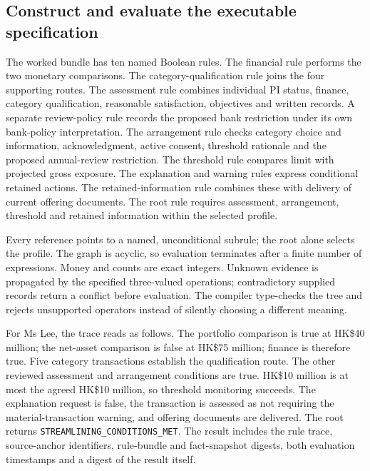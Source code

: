 \subsection{Construct and evaluate the executable specification}
\label{merge:P-01b-complete-dry-run:04}


The worked bundle has ten named Boolean rules. The financial rule performs the
two monetary comparisons. The category-qualification rule joins the four
supporting routes. The assessment rule combines individual PI status, finance,
category qualification, reasonable satisfaction, objectives and written records.
A separate review-policy rule records the proposed bank restriction under its
own bank-policy interpretation. The arrangement rule checks category choice and information, acknowledgment,
active consent, threshold rationale and the proposed annual-review restriction.
The threshold rule compares limit with projected gross exposure. The explanation
and warning rules express conditional retained actions. The retained-information
rule combines these with delivery of current offering documents. The root rule
requires assessment, arrangement, threshold and retained information within the
selected profile.

Every reference points to a named, unconditional subrule; the root alone selects
the profile. The graph is acyclic, so evaluation terminates after a finite number
of expressions. Money and counts are exact integers. Unknown evidence is
propagated by the specified three-valued operations; contradictory supplied
records return a conflict before evaluation. The compiler type-checks the tree
and rejects unsupported operators instead of silently choosing a different
meaning.

For Ms Lee, the trace reads as follows. The portfolio comparison is true at
HK\$40 million; the net-asset comparison is false at HK\$75 million; finance
is therefore true. Five category transactions establish the qualification route.
The other reviewed assessment and arrangement conditions are true. HK\$10
million is at most the agreed HK\$10 million, so threshold monitoring succeeds.
The explanation request is false, the transaction is assessed as not requiring
the material-transaction warning, and offering documents are delivered. The root
returns \texttt{STREAMLINING\_CONDITIONS\_MET}. The result includes the rule
trace, source-anchor identifiers, rule-bundle and fact-snapshot digests, both
evaluation timestamps and a digest of the result itself.

